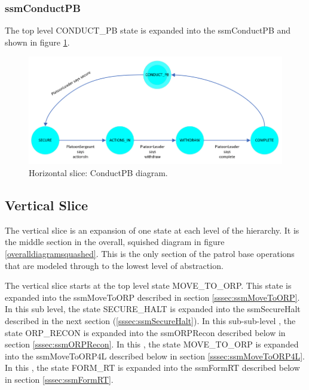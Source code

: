 \documentclass[../../main/main.tex]{subfiles}
\begin{document}
\subsubsection{ssmConductPB}\label{sssec:ssmConductPB}
The top level CONDUCT_PB state is expanded into the ssmConductPB  and shown in figure \ref{ssmConductPBDiagram}.

\begin{figure}[h!]
\centering
\includegraphics[width=\textwidth]{../figures/ssmConductPBDiagram}
\caption{\label{ssmConductPBDiagram} Horizontal slice: ConductPB diagram.}
\end{figure}
\clearpage

\subsection{Vertical Slice}\label{ssec:verticalslice}
The vertical slice is an expansion of one state at each level of the hierarchy.  It is the middle section in the overall, squished diagram in figure \ref{overalldiagramsquashed}.  This is the only section of the patrol base operations that are modeled through to the lowest level of abstraction.

The vertical slice starts at the top level state MOVE_TO_ORP.  This state is expanded into the ssmMoveToORP  described in section \ref{sssec:ssmMoveToORP}. In this sub level, the state SECURE_HALT is expanded into the ssmSecureHalt  described in the next section (\ref{sssec:ssmSecureHalt}).  In this sub-sub-level , the state ORP_RECON is expanded into the ssmORPRecon  described below in section \ref{sssec:ssmORPRecon}.  In this , the state MOVE_TO_ORP is expanded into the ssmMoveToORP4L  described below in section \ref{sssec:ssmMoveToORP4L}.  In this , the state FORM_RT is expanded into the ssmFormRT  described below in section \ref{sssec:ssmFormRT}.  
\end{document}
